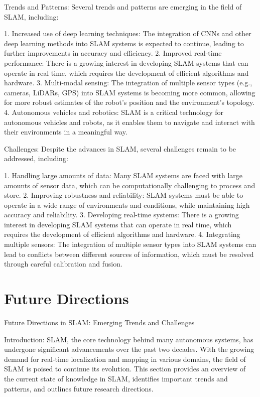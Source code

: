 \documentclass[conference]{IEEEtran}
\begin{document}
Trends and Patterns:
Several trends and patterns are emerging in the field of SLAM, including:

1. Increased use of deep learning techniques: The integration of CNNs and other deep learning methods into SLAM systems is expected to continue, leading to further improvements in accuracy and efficiency.
2. Improved real-time performance: There is a growing interest in developing SLAM systems that can operate in real time, which requires the development of efficient algorithms and hardware.
3. Multi-modal sensing: The integration of multiple sensor types (e.g., cameras, LiDARs, GPS) into SLAM systems is becoming more common, allowing for more robust estimates of the robot's position and the environment's topology.
4. Autonomous vehicles and robotics: SLAM is a critical technology for autonomous vehicles and robots, as it enables them to navigate and interact with their environments in a meaningful way.

Challenges:
Despite the advances in SLAM, several challenges remain to be addressed, including:

1. Handling large amounts of data: Many SLAM systems are faced with large amounts of sensor data, which can be computationally challenging to process and store.
2. Improving robustness and reliability: SLAM systems must be able to operate in a wide range of environments and conditions, while maintaining high accuracy and reliability.
3. Developing real-time systems: There is a growing interest in developing SLAM systems that can operate in real time, which requires the development of efficient algorithms and hardware.
4. Integrating multiple sensors: The integration of multiple sensor types into SLAM systems can lead to conflicts between different sources of information, which must be resolved through careful calibration and fusion.

\section{Future Directions}
Future Directions in SLAM: Emerging Trends and Challenges

Introduction:
SLAM, the core technology behind many autonomous systems, has undergone significant advancements over the past two decades. With the growing demand for real-time localization and mapping in various domains, the field of SLAM is poised to continue its evolution. This section provides an overview of the current state of knowledge in SLAM, identifies important trends and patterns, and outlines future research directions.
\end{document}
